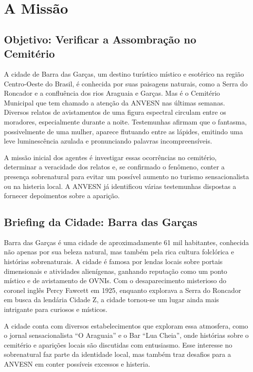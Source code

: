 \chapter{A Missão}

\section{Objetivo: Verificar a Assombração no Cemitério}
A cidade de Barra das Garças, um destino turístico místico e esotérico na região Centro-Oeste do Brasil, é conhecida por suas paisagens naturais, como a Serra do Roncador e a confluência dos rios Araguaia e Garças. Mas é o Cemitério Municipal que tem chamado a atenção da ANVESN nas últimas semanas. Diversos relatos de avistamentos de uma figura espectral circulam entre os moradores, especialmente durante a noite. Testemunhas afirmam que o fantasma, possivelmente de uma mulher, aparece flutuando entre as lápides, emitindo uma leve luminescência azulada e pronunciando palavras incompreensíveis.

A missão inicial dos agentes é investigar essas ocorrências no cemitério, determinar a veracidade dos relatos e, se confirmado o fenômeno, conter a presença sobrenatural para evitar um possível aumento no turismo sensacionalista ou na histeria local. A ANVESN já identificou várias testemunhas dispostas a fornecer depoimentos sobre a aparição.

\section{Briefing da Cidade: Barra das Garças}
Barra das Garças é uma cidade de aproximadamente 61 mil habitantes, conhecida não apenas por sua beleza natural, mas também pela rica cultura folclórica e histórias sobrenaturais. A cidade é famosa por lendas locais sobre portais dimensionais e atividades alienígenas, ganhando reputação como um ponto místico e de avistamento de OVNIs. Com o desaparecimento misterioso do coronel inglês Percy Fawcett em 1925, enquanto explorava a Serra do Roncador em busca da lendária Cidade Z, a cidade tornou-se um lugar ainda mais intrigante para curiosos e místicos.

A cidade conta com diversos estabelecimentos que exploram essa atmosfera, como o jornal sensacionalista ``O Araguaia'' e o Bar ``Lua Cheia'', onde histórias sobre o cemitério e aparições locais são discutidas com entusiasmo. Esse interesse no sobrenatural faz parte da identidade local, mas também traz desafios para a ANVESN em conter possíveis excessos e histeria.

